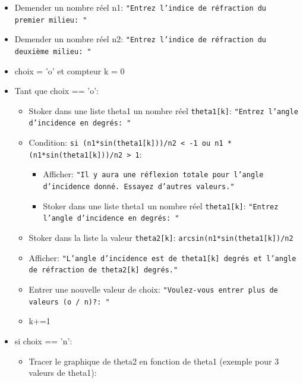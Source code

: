 \documentclass[%
oneside,                 %
final,                   %
10pt,french]{article}
\newenvironment{doconceexercise}{}{}
\begin{document}
\begin{doconceexercise}
\begin{itemize}
 \item Demender un nombre réel n1: \texttt{"Entrez l'indice de réfraction du premier milieu: "}

 \item Demender un nombre réel n2: \texttt{"Entrez l'indice de réfraction du deuxième milieu: "}

 \item choix = 'o' et compteur k = 0

 \item Tant que choix == 'o':
\begin{itemize}

   \item Stoker dans une liste theta1 un nombre réel \texttt{theta1[k]}: \texttt{"Entrez l'angle d'incidence en degrés: "}

   \item Condition: \texttt{si (n1*sin(theta1[k]))/n2 < -1 ou n1 * (n1*sin(theta1[k]))/n2 > 1}:
\begin{itemize}

     \item Afficher: \texttt{"Il y aura une réflexion totale pour l'angle d'incidence donné. Essayez d'autres valeurs."}

     \item Stoker dans une liste theta1 un nombre réel \texttt{theta1[k]}: \texttt{"Entrez l'angle d'incidence en degrés: "}

\end{itemize}

\noindent
   \item Stoker dans la liste la valeur \texttt{theta2[k]}: \texttt{arcsin(n1*sin(theta1[k])/n2}

   \item Afficher: \texttt{"L'angle d'incidence est de theta1[k] degrés et l'angle de réfraction de theta2[k] degrés."}

   \item Entrer une nouvelle valeur de choix: \texttt{"Voulez-vous entrer plus de valeurs (o / n)?: "}

   \item k+=1

\end{itemize}

\noindent
 \item si choix == 'n':
\begin{itemize}

   \item Tracer le graphique de theta2 en fonction de theta1 (exemple pour 3 valeurs de theta1):
\end{itemize}


\end{itemize}
\end{doconceexercise}
\end{document}
